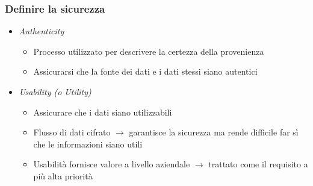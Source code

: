 \begin{frame}
  \frametitle{Definire la sicurezza}
  \begin{itemize}[<+- | alert@+>]
  \item \textit{Authenticity}
  	\begin{itemize}
  	\item Processo utilizzato per descrivere la certezza della provenienza
  	\item Assicurarsi che la fonte dei dati e i dati stessi siano autentici
  	\end{itemize}
  \item \textit{Usability (o Utility)}
  \begin{itemize}
  \item Assicurare che i dati siano utilizzabili
  \item Flusso di dati cifrato $\rightarrow$ garantisce la sicurezza ma rende difficile far sì che le informazioni siano utili
  \item Usabilità fornisce valore a livello aziendale $\rightarrow$ trattato come il requisito a più alta priorità
  \end{itemize}
  \end{itemize}
\end{frame}

